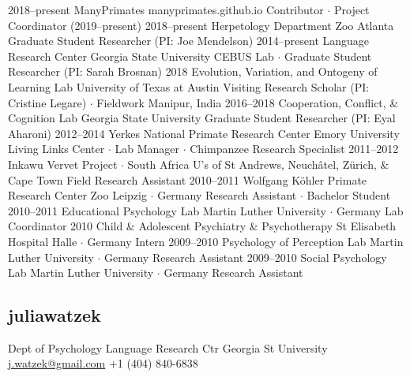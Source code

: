 \documentclass[]{friggeri-cv}
\begin{document}
\begin{entrylist}
  \entry
    {2018--present}
    {ManyPrimates}
    {manyprimates.github.io}
    {Contributor $\cdot$ Project Coordinator (2019--present)}
  \entry
    {2018--present}
    {Herpetology Department}
    {Zoo Atlanta}
    {Graduate Student Researcher (PI: Joe Mendelson)}
  \entry
    {2014--present}
    {Language Research Center}
    {Georgia State University}
    {CEBUS Lab $\cdot$ Graduate Student Researcher (PI: Sarah Brosnan)}
  \entry
    {2018}
    {Evolution, Variation, and Ontogeny of Learning Lab}
    {University of Texas at Austin}
    {Visiting Research Scholar (PI: Cristine Legare) $\cdot$ Fieldwork Manipur, India}
  \entry
    {2016--2018}
    {Cooperation, Conflict, \& Cognition Lab}
    {Georgia State University}
    {Graduate Student Researcher (PI: Eyal Aharoni)}
  \entry
    {2012--2014}
    {Yerkes National Primate Research Center}
    {Emory University}
    {Living Links Center $\cdot$ Lab Manager $\cdot$ Chimpanzee Research Specialist}
  \entry
    {2011--2012}
    {Inkawu Vervet Project $\cdot$ South Africa}
    {U's of St Andrews, Neuch\^{a}tel, Z\"urich, \& Cape Town}
    {Field Research Assistant}
  \entry
    {2010--2011}
    {Wolfgang K\"{o}hler Primate Research Center}
    {Zoo Leipzig $\cdot$ Germany}
    {Research Assistant $\cdot$ Bachelor Student}
  \entry
    {2010--2011}
    {Educational Psychology Lab}
    {Martin Luther University $\cdot$ Germany}
    {Lab Coordinator}
  \entry
    {2010}
    {Child \& Adolescent Psychiatry \& Psychotherapy}
    {St Elisabeth Hospital Halle $\cdot$ Germany}
    {Intern}
  \entry
    {2009--2010}
    {Psychology of Perception Lab}
    {Martin Luther University $\cdot$ Germany}
    {Research Assistant}
  \entry
    {2009--2010}
    {Social Psychology Lab}
    {Martin Luther University $\cdot$ Germany}
    {Research Assistant}
\end{entrylist}



\begin{aside}
  \section{{\normalfont julia}watzek}
    Dept of Psychology
    Language Research Ctr
    Georgia St University
    ~
    \href{mailto:j.watzek@gmail.com}{j.watzek@gmail.com}
    +1 (404) 840-6838
\end{aside}
\end{document}
